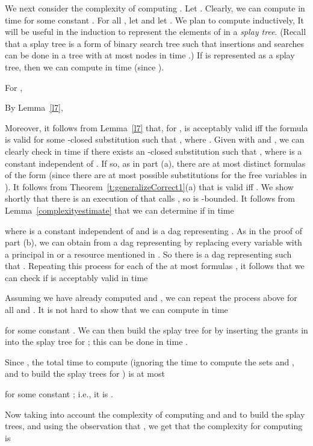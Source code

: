 \documentclass{acmtrans2m}
\newcommand{\<}{
}
\renewcommand{\>}{\rangle}
\begin{document}
\begin{sloppypar}
We next consider the complexity of computing .  Let
.  Clearly, we can
compute  in time  for some constant .  For all
, let  and let .
We plan to compute  inductively,  It will be useful in the induction to represent the
elements of  in a \emph{splay tree}.  (Recall that a splay tree is a form of binary search
tree such that  insertions and searches can be done in a tree with at most  nodes in time
 \cite{ST}.)  If  is represented as a splay tree, then we can compute 
in time  (since ).

For ,

By Lemma~\ref{l7},

Moreover, it follows from Lemma~\ref{l7} that, for ,
  is acceptably
valid iff the formula  is valid for some -closed substitution  such that
, where
.  Given  with
 and , we can clearly check in time  if
there exists an -closed substitution  such that ,
where  is a constant independent of .  If so, as in part (a), there are at most
 distinct formulas of the form  (since there are at most 
possible substitutions for the free variables in ).  It follows from
Theorem~\ref{t:generalizeCorrect1}(a) that
 is valid iff
.  We show shortly that there is an execution of
 that calls , so
 is -bounded.  It follows from
Lemma~\ref{complexityestimate} that we can determine if
 in time

where  is a constant independent of  and  is a dag representing
.  As in the proof of part (b), we can obtain  from a dag
 representing  by replacing every variable with a principal in  or a
resource mentioned in .  So there is a dag 
representing  such that .
Repeating this process for each of the at most  formulas , it follows
that we can check if
  is acceptably
valid in time


Assuming we have already computed  and , we can repeat the process above for all
 and .  It is not hard to show that we can compute  in time

for some constant .  We can then build the splay tree for  by inserting the grants
in  into the splay tree for ; this can be done in time
.

Since , the total time to compute 
(ignoring the time to compute the sets  and , and to build the splay trees for ) is
at most

for some constant ; i.e., it is .

Now taking into account the complexity of computing  and  and to build the splay trees, and
using the observation that , we get that the complexity for
computing  is



\end{sloppypar}
\end{document}
